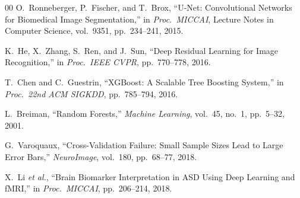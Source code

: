 \documentclass[conference]{IEEEtran}
\begin{document}
\begin{thebibliography}{00}
O.~Ronneberger, P.~Fischer, and T.~Brox, ``U-Net: Convolutional Networks for Biomedical Image Segmentation,'' in \textit{Proc.~MICCAI}, Lecture Notes in Computer Science, vol.~9351, pp.~234--241, 2015.

K.~He, X.~Zhang, S.~Ren, and J.~Sun, ``Deep Residual Learning for Image Recognition,'' in \textit{Proc.~IEEE CVPR}, pp.~770--778, 2016.

T.~Chen and C.~Guestrin, ``XGBoost: A Scalable Tree Boosting System,'' in \textit{Proc.~22nd ACM SIGKDD}, pp.~785--794, 2016.

L.~Breiman, ``Random Forests,'' \textit{Machine Learning}, vol.~45, no.~1, pp.~5--32, 2001.

G.~Varoquaux, ``Cross-Validation Failure: Small Sample Sizes Lead to Large Error Bars,'' \textit{NeuroImage}, vol.~180, pp.~68--77, 2018.

X.~Li \textit{et al.}, ``Brain Biomarker Interpretation in ASD Using Deep Learning and fMRI,'' in \textit{Proc.~MICCAI}, pp.~206--214, 2018.

\end{thebibliography}
\end{document}
